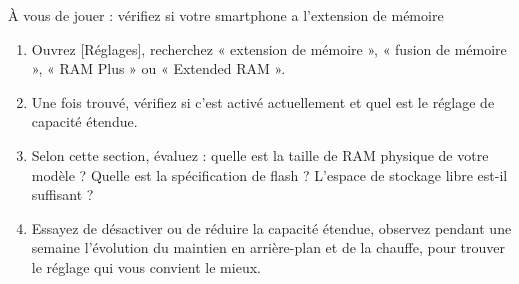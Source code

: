 \begin{tcbpractice}{À vous de jouer : vérifiez si votre smartphone a l'extension de mémoire}
\begin{enumerate}
  \item Ouvrez [Réglages], recherchez « extension de mémoire », « fusion de mémoire », « RAM Plus » ou « Extended RAM ».
  \item Une fois trouvé, vérifiez si c'est activé actuellement et quel est le réglage de capacité étendue.
  \item Selon cette section, évaluez : quelle est la taille de RAM physique de votre modèle ? Quelle est la spécification de flash ? L'espace de stockage libre est-il suffisant ?
  \item Essayez de désactiver ou de réduire la capacité étendue, observez pendant une semaine l'évolution du maintien en arrière-plan et de la chauffe, pour trouver le réglage qui vous convient le mieux.
\end{enumerate}

\end{tcbpractice}
